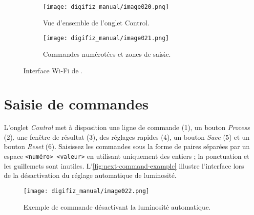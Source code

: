 \begin{figure}[htbp]
    \centering
    \begin{subfigure}{0.48\textwidth}
        \texttt{[image: digifiz\_manual/image020.png]}
        \caption{Vue d'ensemble de l'onglet Control.}
    \end{subfigure}\hfill
    \begin{subfigure}{0.48\textwidth}
        \texttt{[image: digifiz\_manual/image021.png]}
        \caption{Commandes numérotées et zones de saisie.}
    \end{subfigure}
    \caption{Interface Wi-Fi de \ReplicaNextShort{}.}
    \label{fig:next-control-tabs}
\end{figure}

\section{Saisie de commandes}
L'onglet \emph{Control} met à disposition une ligne de commande (1), un bouton \emph{Process} (2), une fenêtre de résultat (3), des réglages rapides (4), un bouton \emph{Save} (5) et un bouton \emph{Reset} (6).
Saisissez les commandes sous la forme de paires séparées par un espace \verb|<numéro> <valeur>| en utilisant uniquement des entiers ; la ponctuation et les guillemets sont inutiles.
L'\autoref{fig:next-command-example} illustre l'interface lors de la désactivation du réglage automatique de luminosité.

\begin{figure}[htbp]
    \centering
    \texttt{[image: digifiz\_manual/image022.png]}
    \caption{Exemple de commande désactivant la luminosité automatique.}
    \label{fig:next-command-example}
\end{figure}

